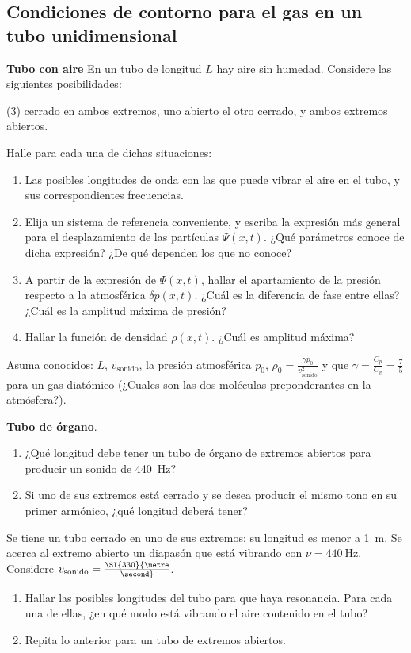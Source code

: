 \subsection*{Condiciones de contorno para el gas en un tubo unidimensional}

\item \textbf{Tubo con aire}
En un tubo de longitud $L$ hay aire sin humedad.
Considere las siguientes posibilidades: 
\begin{tasks}(3)
	\task cerrado en ambos extremos,
	\task uno abierto el otro cerrado, y
	\task ambos extremos abiertos.
\end{tasks}
Halle para cada una de dichas situaciones: 
\begin{enumerate}
	\item Las posibles longitudes de onda con las que puede vibrar el aire en el tubo, y sus correspondientes frecuencias. 
	\item Elija un sistema de referencia conveniente, y escriba la expresión más general para el desplazamiento de las partículas $\Psi(x,t)$.
	¿Qué parámetros conoce de dicha expresión?
	¿De qué dependen los que no conoce? 
	\item A partir de la expresión de $\Psi(x,t)$, hallar el apartamiento de la presión respecto a la atmosférica $\delta p(x,t)$.
	¿Cuál es la diferencia de fase entre ellas?
	¿Cuál es la amplitud máxima de presión? 
	\item Hallar la función de densidad $\rho(x,t)$.
	¿Cuál es amplitud máxima?
\end{enumerate}
Asuma conocidos: $L$, $v_\text{sonido}$, la presión atmosférica $p_0$, $\rho_{0}= \frac{ \gamma p_0 }{ v_\text{sonido}^2}$ y que $\gamma= \frac{C_p}{C_v}= \frac{7}{5}$ para un gas diatómico (¿Cuales son las dos moléculas preponderantes en la atmósfera?).


\item \textbf{Tubo de órgano}. 
\begin{enumerate}
\item ¿Qué longitud debe tener un tubo de órgano de extremos abiertos para producir un sonido de \SI{440}{\hertz}? 
\item Si uno de sus extremos está cerrado y se desea producir el mismo tono en su primer armónico, ¿qué longitud deberá tener?
\end{enumerate}


\item Se tiene un tubo cerrado en uno de sus extremos; su longitud es menor a \SI{1}{\metre}.
Se acerca al extremo abierto un diapasón que está vibrando con $\nu = \SI{440}{\hertz}$.
Considere $v_\text{sonido} = \SI{330}{\metre\over\second}$.
\begin{enumerate}
	\item Hallar las posibles longitudes del tubo para que haya resonancia.
	Para cada una de ellas, ¿en qué modo está vibrando el aire contenido en el tubo? 
	\item Repita lo anterior para un tubo de extremos abiertos.
\end{enumerate}


